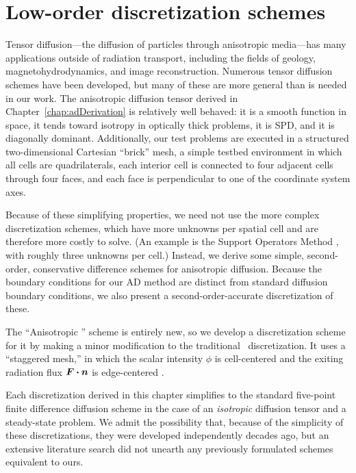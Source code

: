 
\chapter{Low-order discretization schemes} \label{chap:implementation}

Tensor diffusion---the diffusion of particles through anisotropic media---has
many applications outside of radiation transport, including the fields of geology,
magnetohydrodynamics, and image reconstruction. Numerous tensor diffusion
schemes have been developed, but many of these are more general than is needed
in our work. The anisotropic diffusion tensor derived in
Chapter~\ref{chap:adDerivation} is relatively well behaved: it is a smooth
function in space, it tends toward isotropy in optically thick problems, it is
SPD, and it is diagonally dominant. Additionally, our test problems
are executed in a structured
two-dimensional Cartesian ``brick'' mesh, a simple testbed environment in which
all cells are
quadrilaterals, each interior cell is connected to four adjacent cells through
four faces, and each face is
perpendicular to one of the coordinate system axes.

Because of these simplifying properties, we need not use the more
complex discretization schemes, which have more unknowns
per spatial cell and are therefore more costly to solve.
(An example is the Support Operators Method \cite{Mor1998,Run2006}, with
roughly three unknowns per cell.) Instead, we derive some simple, second-order,
conservative
difference schemes for anisotropic diffusion. Because the
boundary conditions for our AD method are distinct from standard diffusion
boundary conditions, we also present a second-order-accurate discretization of
these.

The ``Anisotropic \Pone'' scheme is entirely new, so we develop a discretization
scheme for it by making a minor modification to the traditional \Pone\
discretization. It uses a ``staggered mesh,'' in which the scalar intensity
$\phi$ is cell-centered and the exiting radiation flux $\bm{F}\bm{\cdot} \bm{n}$ is
edge-centered \cite{War2003}.

Each discretization derived in this chapter simplifies to the standard
five-point finite difference diffusion scheme in the case of an
\emph{isotropic} diffusion tensor and a steady-state problem. We admit the
possibility that, because of the simplicity of these discretizations, they were
developed independently decades ago, but an extensive literature search did not
unearth any previously formulated schemes equivalent to ours.

